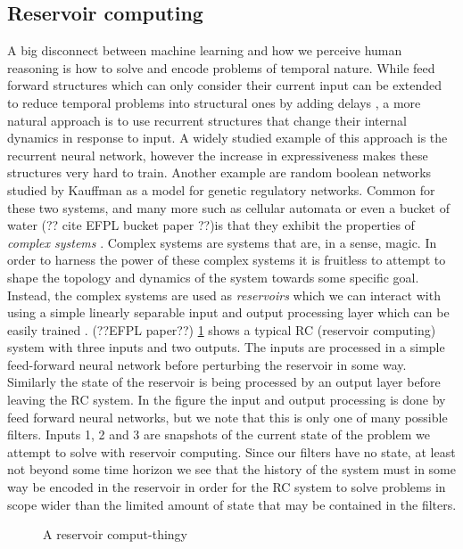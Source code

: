 \subsection{Reservoir computing}
A big disconnect between machine learning and how we perceive human reasoning is
how to solve and encode problems of temporal nature.
While feed forward structures which can only consider their current input can be
extended to reduce temporal problems into structural ones by adding delays
\cite{schrauwen_overview_2007}, a more natural approach is to use
recurrent structures that change their internal dynamics in response to input.
A widely studied example of this approach is the recurrent neural network,
however the increase in expressiveness makes these structures very hard to
train\cite{bertschinger_real-time_2004}.
Another example are random boolean networks \cite{gershenson_introduction_2004}
studied by Kauffman as a  model for genetic regulatory networks.
Common for these two systems, and many more such as cellular
automata \cite{sipper_emergence_1999} or even a bucket of water (?? cite EFPL
bucket paper ??)is that they exhibit the properties of \textit{complex systems}
\cite{langton_computation_1990}.
Complex systems are systems that are, in a sense, magic.
In order to harness the power of these complex systems it is fruitless to
attempt to shape the topology and dynamics of the system towards some specific
goal. Instead, the complex systems are used as \textit{reservoirs} which we can
interact with using a simple linearly separable input and output processing
layer which can be easily trained \cite{schrauwen_overview_2007}. (??EFPL paper??)
\ref{fig:RC} shows a typical RC (reservoir computing) system with three inputs
and two outputs. The inputs are processed in a simple feed-forward neural
network before perturbing the reservoir in some way. Similarly the state of the
reservoir is being processed by an output layer before leaving the RC system.
In the figure the input and output processing is done by feed forward neural
networks, but we note that this is only one of many possible filters.
Inputs 1, 2 and 3 are snapshots of the current state of the problem we attempt
to solve with reservoir computing. Since our filters have no state, at least not
beyond some time horizon we see that the history of the system must in some way
be encoded in the reservoir in order for the RC system to solve problems in
scope wider than the limited amount of state that may be contained in the filters.
\begin{figure}[h]
  
  \caption{A reservoir comput-thingy}
  \label{fig:RC}
\end{figure}
